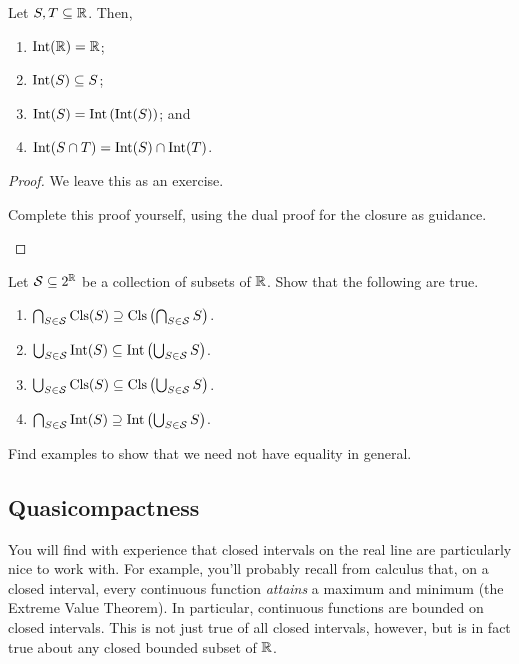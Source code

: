 \begin{thm}
Let $S,T\subseteq \mathbb{R}$.  Then,
\begin{enumerate}
\item $\operatorname{Int} (\mathbb{R} )=\mathbb{R}$;
\item $\operatorname{Int} (S)\subseteq S$;
\item $\operatorname{Int} (S)=\operatorname{Int} \left( \operatorname{Int} (S)\right)$; and
\item $\operatorname{Int} (S\cap T)=\operatorname{Int} (S)\cap \operatorname{Int} (T)$.
\end{enumerate}
\begin{proof}
We leave this as an exercise.
\begin{exr}
Complete this proof yourself, using the dual proof for the closure as guidance.
\end{exr}
\end{proof}
\end{thm}
\begin{exr}\label{exr3.4.53}
Let $\mathcal{S}\subseteq 2^{\mathbb{R}}$ be a collection of subsets of $\mathbb{R}$.  Show that the following are true.
\begin{enumerate}
\item \label{enm3.4.53.i}$\bigcap _{S\in \mathcal{S}}\operatorname{Cls} (S)\supseteq \operatorname{Cls} \left( \bigcap _{S\in \mathcal{S}}S\right)$.
\item \label{enm3.4.53.ii}$\bigcup _{S\in \mathcal{S}}\operatorname{Int} (S)\subseteq \operatorname{Int} \left( \bigcup _{S\in \mathcal{S}}S\right) $.
\item \label{enm3.4.53.iii}$\bigcup _{S\in \mathcal{S}}\operatorname{Cls} (S)\subseteq \operatorname{Cls} \left( \bigcup _{S\in \mathcal{S}}S\right)$.
\item \label{enm3.4.53.iv}$\bigcap _{S\in \mathcal{S}}\operatorname{Int} (S)\supseteq \operatorname{Int} \left( \bigcup _{S\in \mathcal{S}}S\right)$.
\end{enumerate}
Find examples to show that we need not have equality in general.
\end{exr}

\subsection{Quasicompactness}

You will find with experience that closed intervals on the real line are particularly nice to work with.  For example, you'll probably recall from calculus that, on a closed interval, every continuous function \emph{attains} a maximum and minimum (the Extreme Value Theorem).  In particular, continuous functions are bounded on closed intervals.  This is not just true of all closed intervals, however, but is in fact true about any closed bounded subset of $\mathbb{R}$.

